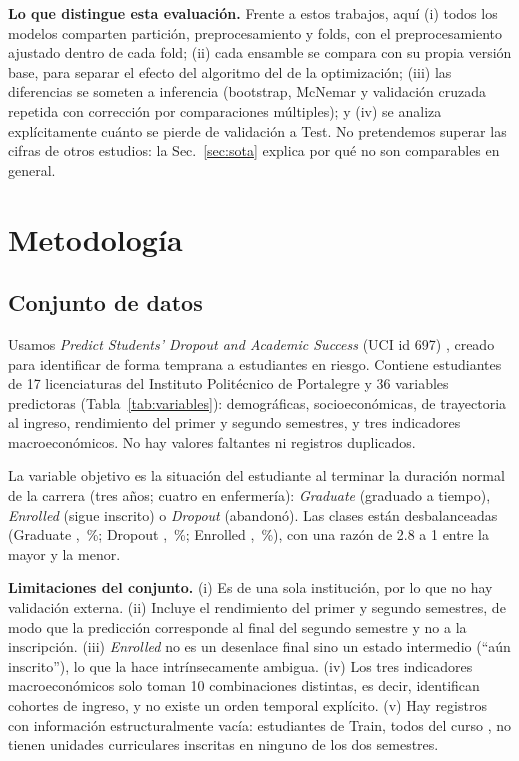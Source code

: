 \documentclass[conference]{IEEEtran}
\newcommand{\cD}{\emph{Dropout}}
\newcommand{\cE}{\emph{Enrolled}}
\newcommand{\cG}{\emph{Graduate}}
\begin{document}
\textbf{Lo que distingue esta evaluación.} Frente a estos trabajos, aquí (i) todos los modelos comparten partición, preprocesamiento y folds, con el preprocesamiento ajustado dentro de cada fold; (ii) cada ensamble se compara con su propia versión base, para separar el efecto del algoritmo del de la optimización; (iii) las diferencias se someten a inferencia (bootstrap, McNemar y validación cruzada repetida con corrección por comparaciones múltiples); y (iv) se analiza explícitamente cuánto se pierde de validación a Test. No pretendemos superar las cifras de otros estudios: la Sec.~\ref{sec:sota} explica por qué no son comparables en general.

\section{Metodología}\label{sec:met}

\subsection{Conjunto de datos}
Usamos \emph{Predict Students' Dropout and Academic Success} (UCI id 697) \cite{realinho2022,realinho2021uci}, creado para identificar de forma temprana a estudiantes en riesgo. Contiene \Ntot{} estudiantes de 17 licenciaturas del Instituto Politécnico de Portalegre y 36 variables predictoras (Tabla~\ref{tab:variables}): demográficas, socioeconómicas, de trayectoria al ingreso, rendimiento del primer y segundo semestres, y tres indicadores macroeconómicos. No hay valores faltantes ni registros duplicados.

La variable objetivo es la situación del estudiante al terminar la duración normal de la carrera (tres años; cuatro en enfermería): \cG{} (graduado a tiempo), \cE{} (sigue inscrito) o \cD{} (abandonó). Las clases están desbalanceadas (Graduate \ntG{}, \ptG\,\%; Dropout \ntD{}, \ptD\,\%; Enrolled \ntE{}, \ptE\,\%), con una razón de 2.8 a 1 entre la mayor y la menor.



\textbf{Limitaciones del conjunto.} (i) Es de una sola institución, por lo que no hay validación externa. (ii) Incluye el rendimiento del primer y segundo semestres, de modo que la predicción corresponde al final del segundo semestre y no a la inscripción. (iii) \cE{} no es un desenlace final sino un estado intermedio (``aún inscrito''), lo que la hace intrínsecamente ambigua. (iv) Los tres indicadores macroeconómicos solo toman 10 combinaciones distintas, es decir, identifican cohortes de ingreso, y no existe un orden temporal explícito. (v) Hay registros con información estructuralmente vacía: \nSinUC{} estudiantes de Train, todos del curso \cursoSinUC{}, no tienen unidades curriculares inscritas en ninguno de los dos semestres.
\end{document}
